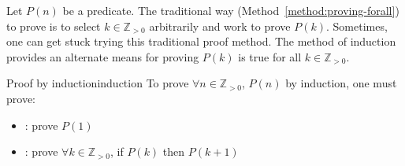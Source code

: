 \documentclass{book}
\theoremstyle{ekimcustom}
\newcommand\defn[1]{{\color{blue}{\bf #1}}}
\begin{document}
Let $P(n)$ be a predicate. The traditional way (Method~\ref{method:proving-forall}) to prove  is to select $k \in \mathbb{Z}_{>0}$ arbitrarily and work to prove $P(k)$. Sometimes, one can get stuck trying this traditional proof method. The method of induction provides an alternate means for proving $P(k)$ is true for all $k \in \mathbb{Z}_{>0}$.

\begin{bmethod}{Proof by induction}{induction}
To prove $\forall n \in \mathbb{Z}_{>0}$, $P(n)$ by induction, one must prove:
\begin{itemize}
\item \defn{base case}: prove $P(1)$
\item \defn{inductive step}: prove $\forall k \in \mathbb{Z}_{>0}$, if $P(k)$ then $P(k+1)$
\end{itemize}
\end{bmethod}
\end{document}
